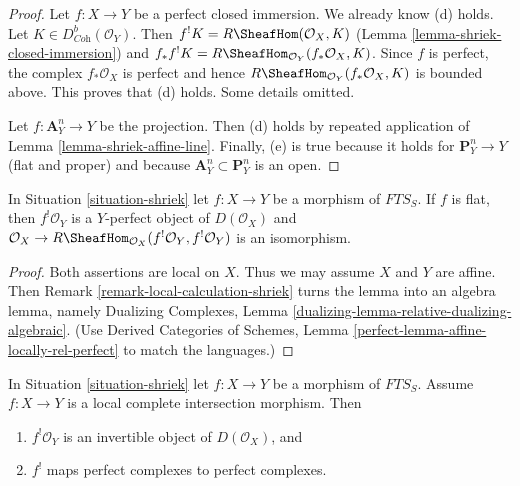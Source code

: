 \begin{proof}
\medskip\noindent
Let $f : X \to Y$ be a perfect closed immersion. We already know (d) holds.
Let $K \in D^b_{\textit{Coh}}(\mathcal{O}_Y)$.
Then $f^!K = R\SheafHom(\mathcal{O}_X, K)$
(Lemma \ref{lemma-shriek-closed-immersion})
and $f_*f^!K = R\SheafHom_{\mathcal{O}_Y}(f_*\mathcal{O}_X, K)$.
Since $f$ is perfect, the complex $f_*\mathcal{O}_X$ is perfect
and hence $R\SheafHom_{\mathcal{O}_Y}(f_*\mathcal{O}_X, K)$ is bounded above.
This proves that (d) holds. Some details omitted.

\medskip\noindent
Let $f : \mathbf{A}^n_Y \to Y$ be the projection. Then (d) holds
by repeated application of Lemma \ref{lemma-shriek-affine-line}.
Finally, (e) is true because it holds for $\mathbf{P}^n_Y \to Y$
(flat and proper) and because $\mathbf{A}^n_Y \subset \mathbf{P}^n_Y$
is an open.
\end{proof}

\begin{lemma}
\label{lemma-flat-shriek-relatively-perfect}
In Situation \ref{situation-shriek} let $f : X \to Y$ be a morphism of
$\textit{FTS}_S$. If $f$ is flat, then
$f^!\mathcal{O}_Y$ is a $Y$-perfect object of $D(\mathcal{O}_X)$ and
$\mathcal{O}_X \to
R\SheafHom_{\mathcal{O}_X}(f^!\mathcal{O}_Y, f^!\mathcal{O}_Y)$
is an isomorphism.
\end{lemma}

\begin{proof}
Both assertions are local on $X$. Thus we may assume $X$ and $Y$ are
affine. Then Remark \ref{remark-local-calculation-shriek}
turns the lemma into an algebra lemma, namely
Dualizing Complexes, Lemma \ref{dualizing-lemma-relative-dualizing-algebraic}.
(Use Derived Categories of Schemes, Lemma
\ref{perfect-lemma-affine-locally-rel-perfect} to match the languages.)
\end{proof}

\begin{lemma}
\label{lemma-lci-shriek}
In Situation \ref{situation-shriek} let $f : X \to Y$ be a morphism of
$\textit{FTS}_S$. Assume $f : X \to Y$ is a local complete
intersection morphism. Then
\begin{enumerate}
\item $f^!\mathcal{O}_Y$ is an invertible object of $D(\mathcal{O}_X)$, and
\item $f^!$ maps perfect complexes to perfect complexes.
\end{enumerate}
\end{lemma}

